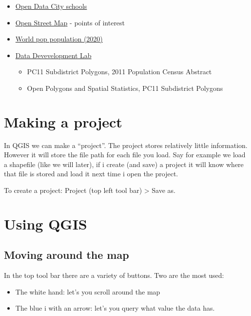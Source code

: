 \documentclass[
  letterpaper,
]{scrbook}
\providecommand{\tightlist}{%
  \setlength{\itemsep}{0pt}\setlength{\parskip}{0pt}}\usepackage{longtable,booktabs,array}
\begin{document}
\begin{itemize}
\tightlist
\item
  \href{https://data.opencity.in/dataset/hyderabad-schools}{Open Data
  City schools}
\item
  \href{https://download.geofabrik.de/}{Open Street Map} - points of
  interest
\item
  \href{https://hub.worldpop.org/geodata/summary?id=49804}{World pop
  population (2020)}
\item
  \href{https://www.devdatalab.org/shrug_download/}{Data Devevelopment
  Lab}

  \begin{itemize}
  \tightlist
  \item
    PC11 Subdistrict Polygons, 2011 Population Census Abstract\\
  \item
    Open Polygons and Spatial Statistics, PC11 Subdistrict Polygons
  \end{itemize}
\end{itemize}

\hypertarget{making-a-project}{%
\section{Making a project}\label{making-a-project}}

In QGIS we can make a ``project''. The project stores relatively little
information. However it will store the file path for each file you load.
Say for example we load a shapefile (like we will later), if i create
(and save) a project it will know where that file is stored and load it
next time i open the project.

To create a project: Project (top left tool bar) \textgreater{} Save as.

\hypertarget{using-qgis}{%
\section{Using QGIS}\label{using-qgis}}

\hypertarget{moving-around-the-map}{%
\subsection{Moving around the map}\label{moving-around-the-map}}

In the top tool bar there are a variety of buttons. Two are the most
used:

\begin{itemize}
\tightlist
\item
  The white hand: let's you scroll around the map
\item
  The blue i with an arrow: let's you query what value the data has.
\end{itemize}
\end{document}
